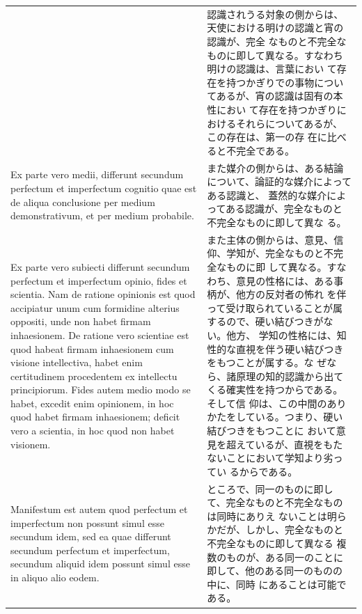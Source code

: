 \documentclass[paper=a4paper,fontsize=10pt,jafontsize=9pt,titlepage]{jlreq}
\begin{document}
\begin{longtable}{p{21em}p{21em}}
&

 認識されうる対象の側からは、天使における明けの認識と宵の認識が、完全
 なものと不完全なものに即して異なる。すなわち明けの認識は、言葉におい
 て存在を持つかぎりでの事物についてあるが、宵の認識は固有の本性におい
 て存在を持つかぎりにおけるそれらについてあるが、この存在は、第一の存
 在に比べると不完全である。

\\
 
 Ex parte vero medii, differunt secundum perfectum et imperfectum
 cognitio quae est de aliqua conclusione per medium demonstrativum, et
 per medium probabile.
 
&

 また媒介の側からは、ある結論について、論証的な媒介によってある認識と、
 蓋然的な媒介によってある認識が、完全なものと不完全なものに即して異な
 る。
 

\\
 

 Ex parte vero subiecti differunt secundum perfectum et imperfectum
 opinio, fides et scientia. Nam de ratione opinionis est quod
 accipiatur unum cum formidine alterius oppositi, unde non habet
 firmam inhaesionem. De ratione vero scientiae est quod habeat firmam
 inhaesionem cum visione intellectiva, habet enim certitudinem
 procedentem ex intellectu principiorum. Fides autem medio modo se
 habet, excedit enim opinionem, in hoc quod habet firmam inhaesionem;
 deficit vero a scientia, in hoc quod non habet visionem.
 
&

 また主体の側からは、意見、信仰、学知が、完全なものと不完全なものに即
 して異なる。すなわち、意見の性格には、ある事柄が、他方の反対者の怖れ
 を伴って受け取られていることが属するので、硬い結びつきがない。他方、
 学知の性格には、知性的な直視を伴う硬い結びつきをもつことが属する。な
 ぜなら、諸原理の知的認識から出てくる確実性を持つからである。そして信
 仰は、この中間のありかたをしている。つまり、硬い結びつきをもつことに
 おいて意見を超えているが、直視をもたないことにおいて学知より劣ってい
 るからである。
 

\\

 Manifestum est autem quod perfectum et imperfectum non possunt simul
 esse secundum idem, sed ea quae differunt secundum perfectum et
 imperfectum, secundum aliquid idem possunt simul esse in aliquo alio
 eodem.
 
 &

 ところで、同一のものに即して、完全なものと不完全なものは同時にありえ
 ないことは明らかだが、しかし、完全なものと不完全なものに即して異なる
 複数のものが、ある同一のことに即して、他のある同一のものの中に、同時
 にあることは可能である。


\end{longtable}
\end{document}
